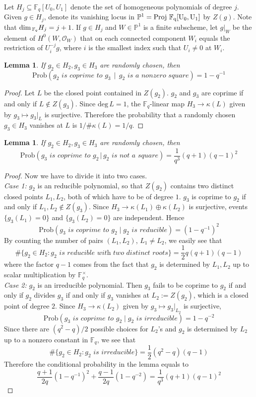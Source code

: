 \documentclass[12pt]{article}
\theoremstyle{plain}
\newtheorem{lemma}[equation]{Lemma}
\theoremstyle{definition}
\newcommand{\IF}{\mathbb{F}}
\newcommand{\IP}{\mathbb{P}}
\newcommand{\sO}{\mathcal{O}}
\renewcommand{\deg}{\mathrm{deg}\,}
\newcommand{\Proj}{\rm Proj\,}
\renewcommand\dim{{\rm dim\,}}
\newcommand{\<}{\langle}
\renewcommand{\>}{\rangle}
\newcommand{\Prob}{\mathrm{Prob}}
\begin{document}
Let $H_j \subseteq \IF_q[U_0, U_1]$ denote the set of homogeneous polynomials of degree $j$. Given $g \in H_j$, denote its vanishing locus in $\IP^1 = \Proj \, \IF_q[U_0, U_1]$ by $Z(g)$. Note that $\dim_{\IF_q} H_j = j + 1$. If $g \in H_j$ and $W \in \IP^1$ is a finite subscheme, let $g|_W$ be the
element of $H^0(W, \sO_W)$ that on each connected component $W_i$ equals the restriction of $U_i^{-j} g$, where $i$ is the smallest index such that $U_i \neq 0$ at $W_i$. 
\begin{lemma} 
\label{square}
If $g_2 \in H_2, g_3 \in H_3$ are randomly chosen, then
$$ \Prob( g_2 \textit{ is coprime to } g_3 \, \mid \, g_2 \textit{ is a nonzero square}) =  1 - q^{-1}$$ 
\end{lemma}
\begin{proof}
Let $L$ be the closed point contained in $Z(g_2)$. $g_2$ and $g_3$ are coprime if and only if $L \not\in Z(g_3)$. Since $\deg L = 1$, the $\IF_q$-linear map $H_3 \to \kappa(L)$ given by $g_3 \mapsto g_3|_{L}$ is surjective. Therefore the probability that a randomly chosen $g_3 \in H_3$ vanishes at $L$ is $1/ \# \kappa(L) = 1/q$. 
\end{proof}

\begin{lemma}
\label{nonsquare} 
If $g_2 \in H_2, g_3 \in H_3$ are randomly chosen, then 
$$ \Prob(g_3 \textit{ is coprime to } g_2 \, | \, g_2 \textit{ is not a square}) = \frac{1}{q^3}(q + 1)(q - 1)^2 $$ 
\end{lemma}
\begin{proof}
Now we have to divide it into two cases. \\
\textit{Case 1:} $g_2$ is an reducible polynomial, so that $Z(g_2)$ contains two distinct closed points $L_1, L_2$, both of which have to be of degree $1$. $g_3$ is coprime to $g_2$ if and only if $L_1, L_2 \not\in Z(g_3)$. Since $H_3 \to \kappa(L_1) \oplus \kappa(L_2)$ is surjective, events $\{ g_3(L_1) = 0\} $ and $\{ g_3(L_2) = 0 \}$ are independent. Hence
$$\Prob(g_3 \textit{ is coprime to }g_2 \mid g_2 \textit{ is reducible}) = (1 - q^{-1})^2 $$ By counting the number of pairs $(L_1, L_2)$, $L_1 \neq L_2$, we easily see that 
$$ \# \{ g_2 \in H_2 : g_2 \textit{ is reducible with two distinct roots} \} = \frac{1}{2}q(q + 1)(q - 1)$$
where the factor $q - 1$ comes from the fact that $g_2$ is determined by $L_1, L_2$ up to scalar multiplication by $\IF_q^\times$. \\
\textit{Case 2:} $g_2$ is an irreducible polynomial. Then $g_3$ fails to be coprime to $g_2$ if and only if $g_2$ divides $g_3$ if and only if $g_3$ vanishes at $L_2:= Z(g_2)$, which is a closed point of degree $2$. Since $H_3 \to \kappa(L_2)$ given by $g_3 \mapsto g_3|_{L_2}$ is surjective, 
$$\Prob(g_3 \textit{ is coprime to }g_2 \mid g_2 \textit{ is irreducible}) = 1 - q^{-2} $$
Since there are $(q^2 - q)/2$ possible choices for $L_2$'s and $g_2$ is determined by $L_2$ up to a nonzero constant in $\IF_q$, we see that 
$$ \# \{ g_2 \in H_2 : g_2 \textit{ is irreducible} \} = \frac{1}{2}(q^2 - q)(q - 1)$$ 
Therefore the conditional probability in the lemma equals to 
$$ \frac{q + 1}{2q} (1 - q^{-1})^2 +  \frac{q - 1}{2q} (1 - q^{-2}) =  \frac{1}{q^3}(q + 1)(q - 1)^2 $$
\end{proof}
\end{document}
